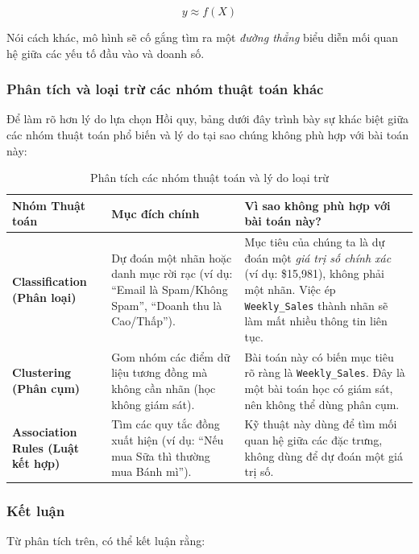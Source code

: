 \[
y \approx f(X)
\]

Nói cách khác, mô hình sẽ cố gắng tìm ra một \textit{đường thẳng} biểu diễn mối quan hệ giữa các yếu tố đầu vào và doanh số.

\subsubsection{Phân tích và loại trừ các nhóm thuật toán khác}

Để làm rõ hơn lý do lựa chọn Hồi quy, bảng dưới đây trình bày sự khác biệt giữa các nhóm thuật toán phổ biến và lý do tại sao chúng không phù hợp với bài toán này:

\begin{table}[H]
\centering
\caption{Phân tích các nhóm thuật toán và lý do loại trừ}
\begin{tabularx}{\textwidth}{|p{3cm}|X|X|}
\hline
\textbf{Nhóm Thuật toán} & \textbf{Mục đích chính} & \textbf{Vì sao không phù hợp với bài toán này?} \\ \hline

\textbf{Classification (Phân loại)} & 
Dự đoán một nhãn hoặc danh mục rời rạc (ví dụ: ``Email là Spam/Không Spam'', ``Doanh thu là Cao/Thấp''). &
Mục tiêu của chúng ta là dự đoán một \textit{giá trị số chính xác} (ví dụ: \$15{,}981), không phải một nhãn. Việc ép \texttt{Weekly\_Sales} thành nhãn sẽ làm mất nhiều thông tin liên tục. \\ \hline

\textbf{Clustering (Phân cụm)} &
Gom nhóm các điểm dữ liệu tương đồng mà không cần nhãn (học không giám sát). &
Bài toán này có biến mục tiêu rõ ràng là \texttt{Weekly\_Sales}. Đây là một bài toán học có giám sát, nên không thể dùng phân cụm. \\ \hline

\textbf{Association Rules (Luật kết hợp)} &
Tìm các quy tắc đồng xuất hiện (ví dụ: ``Nếu mua Sữa thì thường mua Bánh mì''). &
Kỹ thuật này dùng để tìm mối quan hệ giữa các đặc trưng, không dùng để dự đoán một giá trị số. \\ \hline

\end{tabularx}
\end{table}

\subsubsection{Kết luận}

Từ phân tích trên, có thể kết luận rằng:

